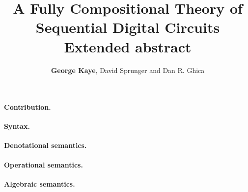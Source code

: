 \documentclass[10pt]{article}
\title{\vspace{-3em}A Fully Compositional Theory of Sequential Digital Circuits\\\textbf{Extended abstract}}
\author{\textbf{George Kaye}, David Sprunger and Dan R. Ghica}
\date{}
\begin{document}
    \maketitle

    \paragraph*{Contribution.}

    \paragraph*{Syntax.}

    \paragraph*{Denotational semantics.}

    \paragraph*{Operational semantics.}

    \paragraph*{Algebraic semantics.}

    \printbibliography[heading=bibintoc,title={References}]
\end{document}
